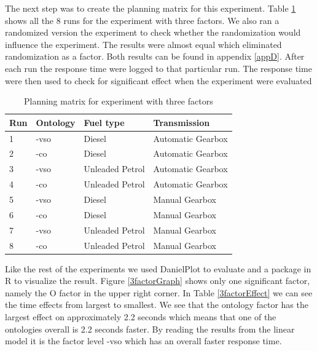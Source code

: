 \documentclass{llncs}
\begin{document}
The next step was to create the planning matrix for this
experiment. Table
\ref{3factor} shows all the 8 runs for the experiment with three
factors. We also ran a randomized version the experiment to check
whether the randomization would influence the experiment. The results
were almost equal which eliminated randomization as a factor.  Both
results can be found in appendix \ref{appD}. After each run the
response time were logged to that particular run. The response time
were then used to check for significant effect when the experiment
were evaluated
\begin{table}
    \begin{tabular}{ | l | l l l |}
    \hline
    {\bf Run} & {\bf Ontology} & {\bf Fuel type} & {\bf Transmission} \\ \hline
	1 & -vso & Diesel & Automatic Gearbox \\ \hline 
	2 & -co & Diesel & Automatic Gearbox \\ \hline 
	3 & -vso & Unleaded Petrol & Automatic Gearbox \\ \hline 
	4 & -co & Unleaded Petrol & Automatic Gearbox \\ \hline 
	5 & -vso & Diesel & Manual Gearbox \\ \hline 
	6 & -co & Diesel & Manual Gearbox \\ \hline 
	7 & -vso & Unleaded Petrol & Manual Gearbox \\ \hline 
	8 & -co & Unleaded Petrol & Manual Gearbox \\ \hline 
    \end{tabular}
\caption{Planning matrix for experiment with three factors}\label{3factor}
\end{table}


Like the rest of the experiments we used DanielPlot to evaluate and a
package in R to visualize the result. Figure \ref{3factorGraph}
shows only one significant factor, namely the \textsf{O} factor in the
upper right corner. In Table \ref{3factorEffect}
we can see the time effects from largest to smallest.  We see that the
ontology factor has the largest effect on approximately 2.2 seconds
which means that one of the ontologies overall is 2.2 seconds
faster. By reading the results from the linear model it is the factor
level \textsf{-vso} which has an overall faster response time.
\end{document}
